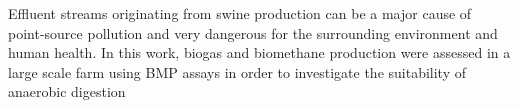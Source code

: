 Effluent streams originating from swine production can be a major cause of point-source pollution and very dangerous for the surrounding environment and human health. In this work, biogas and biomethane production were assessed in a large scale farm using BMP assays in order to investigate the suitability of anaerobic digestion 